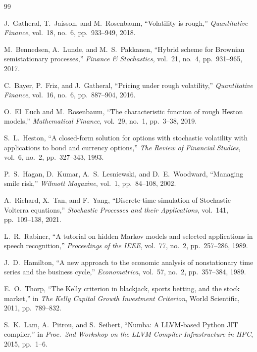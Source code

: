 \documentclass[conference]{IEEEtran}
\begin{document}
\begin{thebibliography}{99}

J.~Gatheral, T.~Jaisson, and M.~Rosenbaum,
``Volatility is rough,''
\textit{Quantitative Finance}, vol.~18, no.~6, pp.~933--949, 2018.

M.~Bennedsen, A.~Lunde, and M.~S.~Pakkanen,
``Hybrid scheme for Brownian semistationary processes,''
\textit{Finance \& Stochastics}, vol.~21, no.~4, pp.~931--965, 2017.

C.~Bayer, P.~Friz, and J.~Gatheral,
``Pricing under rough volatility,''
\textit{Quantitative Finance}, vol.~16, no.~6, pp.~887--904, 2016.

O.~El~Euch and M.~Rosenbaum,
``The characteristic function of rough Heston models,''
\textit{Mathematical Finance}, vol.~29, no.~1, pp.~3--38, 2019.

S.~L.~Heston,
``A closed-form solution for options with stochastic volatility with
  applications to bond and currency options,''
\textit{The Review of Financial Studies}, vol.~6, no.~2, pp.~327--343,
1993.

P.~S.~Hagan, D.~Kumar, A.~S.~Lesniewski, and D.~E.~Woodward,
``Managing smile risk,''
\textit{Wilmott Magazine}, vol.~1, pp.~84--108, 2002.

A.~Richard, X.~Tan, and F.~Yang,
``Discrete-time simulation of Stochastic Volterra equations,''
\textit{Stochastic Processes and their Applications},
vol.~141, pp.~109--138, 2021.

L.~R.~Rabiner,
``A tutorial on hidden Markov models and selected applications in speech
  recognition,''
\textit{Proceedings of the IEEE}, vol.~77, no.~2, pp.~257--286, 1989.

J.~D.~Hamilton,
``A new approach to the economic analysis of nonstationary time series
  and the business cycle,''
\textit{Econometrica}, vol.~57, no.~2, pp.~357--384, 1989.

E.~O.~Thorp,
``The Kelly criterion in blackjack, sports betting, and the stock
  market,''
in \textit{The Kelly Capital Growth Investment Criterion},
World Scientific, 2011, pp.~789--832.

S.~K.~Lam, A.~Pitrou, and S.~Seibert,
``Numba: A LLVM-based Python JIT compiler,''
in \textit{Proc.\ 2nd Workshop on the LLVM Compiler Infrastructure
in HPC}, 2015, pp.~1--6.


\end{thebibliography}
\end{document}
